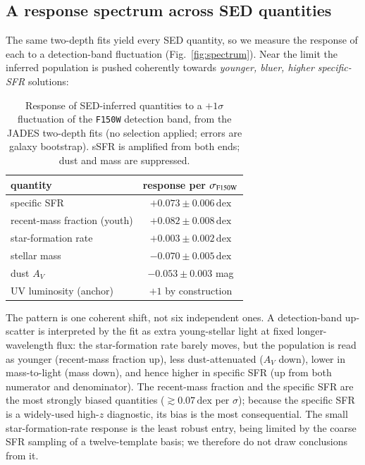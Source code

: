 \documentclass{aa}
\newcommand{\dex}{\,\mathrm{dex}}
\begin{document}
\subsection{A response spectrum across SED quantities}
\label{sec:spectrum}

The same two-depth fits yield every SED quantity, so we measure the response of each to a
detection-band fluctuation (Fig.~\ref{fig:spectrum}). Near the limit the inferred population is
pushed coherently towards \emph{younger, bluer, higher specific-SFR} solutions:

\begin{table}
\centering
\caption{Response of SED-inferred quantities to a $+1\sigma$ fluctuation of the \texttt{F150W}
detection band, from the JADES two-depth fits (no selection applied; errors are galaxy bootstrap).
sSFR is amplified from both ends; dust and mass are suppressed.}
\label{tab:spectrum}
\begin{tabular}{lc}
\toprule
quantity & response per $\sigma_{\rm F150W}$ \\
\midrule
specific SFR              & $+0.073\pm0.006\dex$ \\
recent-mass fraction (youth) & $+0.082\pm0.008\dex$ \\
star-formation rate       & $+0.003\pm0.002\dex$ \\
stellar mass              & $-0.070\pm0.005\dex$ \\
dust $A_V$                & $-0.053\pm0.003$ mag \\
UV luminosity (anchor)    & $+1$ by construction \\
\bottomrule
\end{tabular}
\end{table}

The pattern is one coherent shift, not six independent ones. A detection-band up-scatter is
interpreted by the fit as extra young-stellar light at fixed longer-wavelength flux: the
star-formation rate barely moves, but the population is read as younger (recent-mass fraction up),
less dust-attenuated ($A_V$ down), lower in mass-to-light (mass down), and hence higher in
specific SFR (up from both numerator and denominator). The recent-mass fraction and the specific
SFR are the most strongly biased quantities ($\gtrsim\!0.07\dex$ per $\sigma$); because the
specific SFR is a widely-used high-$z$ diagnostic, its bias is the most consequential. The small
star-formation-rate response is the least robust entry, being limited by the coarse SFR sampling of
a twelve-template basis; we therefore do not draw conclusions from it.
\end{document}
